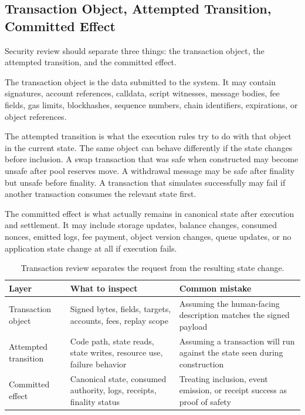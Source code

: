 \subsection{Transaction Object, Attempted Transition, Committed Effect}

Security review should separate three things: the transaction object, the attempted transition, and the committed effect.

The transaction object is the data submitted to the system. It may contain signatures, account references, calldata, script witnesses, message bodies, fee fields, gas limits, blockhashes, sequence numbers, chain identifiers, expirations, or object references.

The attempted transition is what the execution rules try to do with that object in the current state. The same object can behave differently if the state changes before inclusion. A swap transaction that was safe when constructed may become unsafe after pool reserves move. A withdrawal message may be safe after finality but unsafe before finality. A transaction that simulates successfully may fail if another transaction consumes the relevant state first.

The committed effect is what actually remains in canonical state after execution and settlement. It may include storage updates, balance changes, consumed nonces, emitted logs, fee payment, object version changes, queue updates, or no application state change at all if execution fails.

\begin{table}[htbp]
\centering
\small
\renewcommand{\arraystretch}{1.18}
\begin{tabularx}{\textwidth}{@{}>{\RaggedRight\arraybackslash}p{}>{\RaggedRight\arraybackslash}p{}X@{}}
\toprule
Layer & What to inspect & Common mistake \\
\midrule
Transaction object & Signed bytes, fields, targets, accounts, fees, replay scope & Assuming the human-facing description matches the signed payload \\
Attempted transition & Code path, state reads, state writes, resource use, failure behavior & Assuming a transaction will run against the state seen during construction \\
Committed effect & Canonical state, consumed authority, logs, receipts, finality status & Treating inclusion, event emission, or receipt success as proof of safety \\
\bottomrule
\end{tabularx}
\caption{Transaction review separates the request from the resulting state change.}
\end{table}

